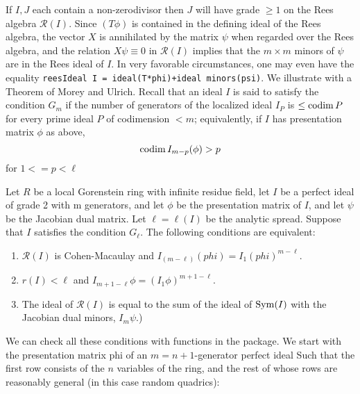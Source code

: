 \documentclass[twoside,12pt, leqno]{amsart}
\def\RR{{\mathcal R}}
\begin{document}
     If $I,J$ each contain a non-zerodivisor then
     $J$ will have grade $\geq 1$ on the Rees algebra $\RR(I)$. Since $(T\phi)$ is contained in the
     defining ideal of the Rees algebra, the vector $X$ is annihilated by the matrix
     $\psi$ when regarded over the Rees algebra, and the relation
     $X\psi \equiv 0$ in $\RR(I)$ implies that the $m\times m$ minors of $\psi$ are
     in the Rees ideal of $I$. In very favorable circumstances,
     one may even have the equality 
     {\tt reesIdeal I = ideal(T*phi)+ideal minors(psi)}. We illustrate with a Theorem of
     Morey and Ulrich. Recall that an ideal $I$ is said to satisfy the condition
     $G_{m}$ if the number of generators of the localized ideal $I_{P}$ is $\leq \operatorname{codim} P$
     for every prime ideal $P$ of codimension $<m$; equivalently, if $I$ has  presentation
      matrix $\phi$ as above, 
     $$
     \operatorname{codim} I_{m-p}(\phi)>p
     $$
     for $1<= p < \ell$
     
     
\begin{theorem}[\cite{MU}]
    Let $R$ be a local Gorenstein ring with infinite residue field, let $I$ be a perfect ideal
     of grade 2 with m generators, and let $\phi$ be the presentation matrix of $I$,
     and let $\psi$ be the Jacobian dual matrix. Let
     $\ell = \ell(I)$ be the analytic spread. Suppose that
     $I$ satisfies the condition $G_{\ell}$. The following conditions are equivalent:
 
\begin{enumerate}
     \item $\RR(I)$ is Cohen-Macaulay and $I_(m-\ell)(phi) = I_1(phi)^{m-\ell}$.
     \item $r(I) < \ell$ and $I_{m+1-\ell}\phi = (I_1\phi)^{m+1-\ell}$.
     \item The ideal of $\RR(I)$ is equal to the sum of the ideal
     of $\operatorname{Sym}(I)$ with the Jacobian dual minors, $I_{m}\psi$.)
\end{enumerate}
    
\end{theorem}

We can check all these conditions with functions in the package.      
     We start with the presentation matrix phi of an $m = n+1$-generator perfect ideal
     Such that the first row consists of the $n$
     variables of the ring, and the rest of whose rows are reasonably general (in this
     case random quadrics):
\end{document}
